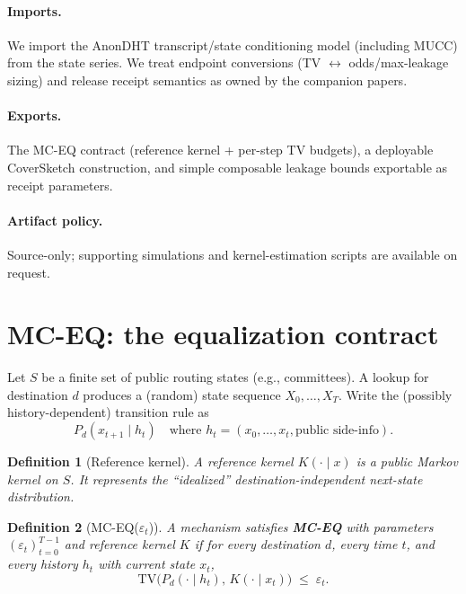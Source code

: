 \documentclass[11pt]{article}
\newtheorem{definition}{Definition}
\newcommand{\TV}{\mathrm{TV}}
\newcommand{\eps}{\varepsilon}
\begin{document}
\paragraph{Imports.}
We import the AnonDHT transcript/state conditioning model (including MUCC) from the state series.\cite{series:state2}
We treat endpoint conversions (TV $\leftrightarrow$ odds/max-leakage sizing) and release receipt semantics as owned by the companion papers.\cite{series:endpointbridge,series:release}

\paragraph{Exports.}
The MC-EQ contract (reference kernel + per-step TV budgets), a deployable CoverSketch construction, and simple composable leakage bounds exportable as receipt parameters.

\paragraph{Artifact policy.}
Source-only; supporting simulations and kernel-estimation scripts are available on request.\cite{series:artifactpolicy}



\section{MC-EQ: the equalization contract}
Let $S$ be a finite set of public routing states (e.g., committees).
A lookup for destination $d$ produces a (random) state sequence $X_0,\dots,X_T$.
Write the (possibly history-dependent) transition rule as
\[
P_d(x_{t+1}\mid h_t) \quad\text{where } h_t=(x_0,\dots,x_t,\text{public side-info}).
\]

\begin{definition}[Reference kernel]
A \emph{reference kernel} $K(\cdot\mid x)$ is a public Markov kernel on $S$.
It represents the ``idealized'' destination-independent next-state distribution.
\end{definition}

\begin{definition}[MC-EQ($\eps_t$)]
A mechanism satisfies \textbf{MC-EQ} with parameters $(\eps_t)_{t=0}^{T-1}$ and reference kernel $K$ if for every destination $d$, every time $t$, and every history $h_t$ with current state $x_t$,
\[
\TV\big(P_d(\cdot\mid h_t),\,K(\cdot\mid x_t)\big)\;\le\; \eps_t.
\]
\end{definition}
\end{document}
